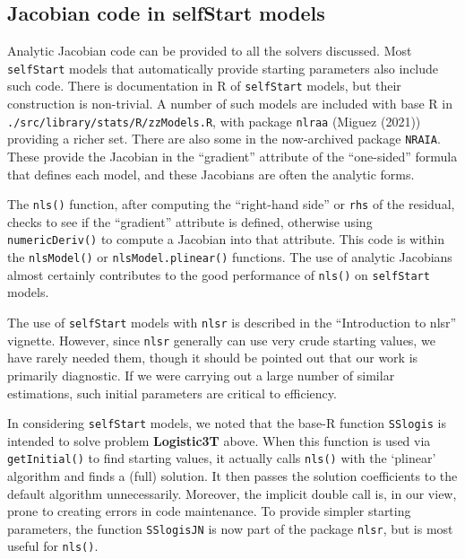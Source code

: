 \hypertarget{jacobian-code-in-selfstart-models}{%
\subsection{Jacobian code in selfStart models}\label{jacobian-code-in-selfstart-models}}

Analytic Jacobian code can be provided to all the solvers discussed.
Most \texttt{selfStart} models that automatically provide starting parameters
also include such code. There is documentation in R
of \texttt{selfStart} models, but their construction is non-trivial. A number
of such models are included with base R in \texttt{./src/library/stats/R/zzModels.R},
with package \texttt{nlraa} (Miguez (2021)) providing a richer set.
There are also some in the now-archived package \texttt{NRAIA}.
These provide the Jacobian in the ``gradient'' attribute of the ``one-sided'' formula
that defines each model, and these Jacobians are often the analytic forms.

The \texttt{nls()} function, after
computing the ``right-hand side'' or \texttt{rhs} of the residual, checks to see if the
``gradient'' attribute is defined, otherwise using \texttt{numericDeriv()} to compute a
Jacobian into that attribute. This code is within the \texttt{nlsModel()} or
\texttt{nlsModel.plinear()} functions. The use of analytic Jacobians
almost certainly contributes to the good performance of \texttt{nls()} on \texttt{selfStart}
models.

The use of \texttt{selfStart} models with
\texttt{nlsr} is described in the ``Introduction to nlsr'' vignette. However, since \texttt{nlsr}
generally can use very crude starting values, we have rarely needed them, though
it should be pointed out that our work is primarily diagnostic. If we were carrying
out a large number of similar estimations, such initial parameters are
critical to efficiency.

In considering \texttt{selfStart} models, we noted that the base-R function \texttt{SSlogis}
is intended to solve problem \textbf{Logistic3T} above. When this function is used
via \texttt{getInitial()} to find
starting values, it actually calls \texttt{nls()} with the `plinear' algorithm
and finds a (full) solution. It then passes the solution coefficients to the default
algorithm unnecessarily. Moreover, the implicit double call is, in our view, prone to creating
errors in code maintenance.
To provide simpler starting parameters, the function \texttt{SSlogisJN}
is now part of the package \texttt{nlsr}, but is most useful for \texttt{nls()}.

